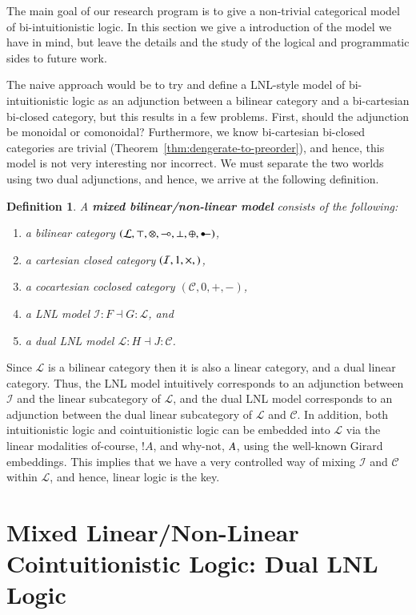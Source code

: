 \documentclass{lmcs}
\newtheorem{definition}[theorem]{Definition}
\let\to\relax
\newcommand{\to}{\rightarrow}
\let\wn\relax
\newcommand{\cat}[1]{\mathcal{#1}}
\newcommand{\limp}[0]{\multimap}
\newcommand{\colimp}[0]{\multimapdotinv}
\newcommand{\wn}[0]{\mathop{?}}
\begin{document}
The main goal of our research program is to give a non-trivial
categorical model of bi-intuitionistic logic.  In this section we give
a introduction of the model we have in mind, but leave the details and
the study of the logical and programmatic sides to future work.

The naive approach would be to try and define a LNL-style model of
bi-intuitionistic logic as an adjunction between a bilinear category
and a bi-cartesian bi-closed category, but this results in a few
problems.  First, should the adjunction be monoidal or comonoidal?
Furthermore, we know bi-cartesian bi-closed categories are trivial
(Theorem~\ref{thm:dengerate-to-preorder}), and hence, this model is
not very interesting nor incorrect.  We must separate the two
worlds using two dual adjunctions, and hence, we arrive at the
following definition.
\begin{definition}
  \label{def:biLNL-model}
  A \textbf{mixed bilinear/non-linear model} consists of the
  following:
  \begin{enumerate}[label=\roman*.]
  \item a bilinear category $(\cat{L},
    \top,\otimes,\limp,\perp,\oplus,\colimp)$,
  \item a cartesian closed category $(\cat{I},1,\times,\to)$,
  \item a cocartesian coclosed category $(\cat{C},0,+,-)$, 
  \item a LNL model $\cat{I} : F \dashv G : \cat{L}$, and
  \item a dual LNL model $\cat{L} : H \dashv J : \cat{C}$.
  \end{enumerate}
\end{definition}
Since $\cat{L}$ is a bilinear category then it is also a linear
category, and a dual linear category.  Thus, the LNL model intuitively
corresponds to an adjunction between $\cat{I}$ and the linear
subcategory of $\cat{L}$, and the dual LNL model corresponds to an
adjunction between the dual linear subcategory of $\cat{L}$ and
$\cat{C}$.  In addition, both intuitionistic logic and
cointuitionistic logic can be embedded into $\cat{L}$ via the linear
modalities of-course, $!A$, and why-not, $\wn A$, using the well-known
Girard embeddings.  This implies that we have a very controlled way of
mixing $\cat{I}$ and $\cat{C}$ within $\cat{L}$, and hence, linear
logic is the key.

\section{Mixed Linear/Non-Linear Cointuitionistic Logic: Dual LNL Logic}
\label{sec:dual_lnl_logic}
\end{document}

